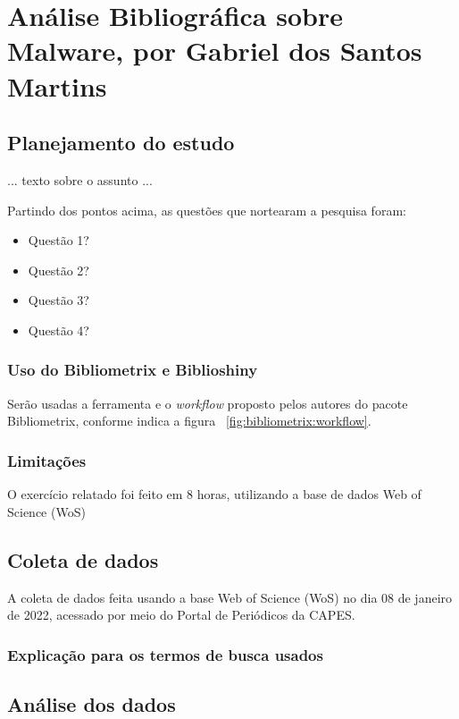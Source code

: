 \chapter{Análise Bibliográfica sobre Malware, por Gabriel dos Santos Martins\label{chap:bibliometria:gsmartins96}}

\section{Planejamento do estudo}

... texto sobre o assunto ...

Partindo dos pontos acima, as questões que nortearam a pesquisa foram:
\begin{itemize}
    \item Questão 1?
    \item Questão 2?
    \item Questão 3? 
    \item Questão 4?
\end{itemize}

\subsection{Uso do Bibliometrix e Biblioshiny}
Serão usadas a ferramenta e o \textit{workflow} proposto pelos autores do pacote Bibliometrix, conforme indica a figura ~\ref{fig:bibliometrix:workflow}.

\subsection{Limitações} O exercício relatado foi feito em 8 horas, utilizando a base de dados Web of Science (WoS)

\section{Coleta de dados\label{MASSA:coleta}}

A coleta de dados feita usando a base Web of Science (WoS) no dia 08 de janeiro de 2022, acessado por meio do Portal de Periódicos da CAPES.

\subsection{Explicação para os termos de busca usados\label{sec:titofrota:query}}

\section{Análise dos dados}

